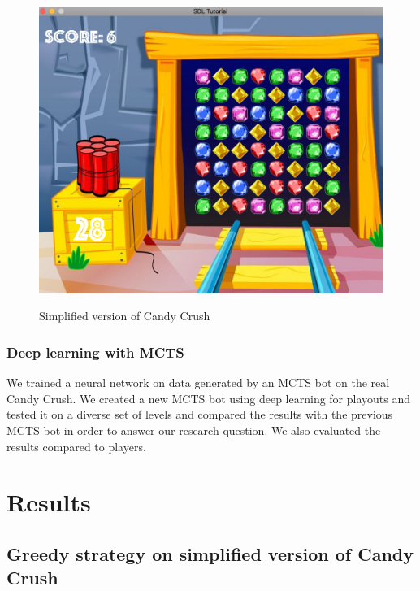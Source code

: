 \documentclass{kththesis}
\begin{document}
\begin{figure}
\centering
\includegraphics[width=\textwidth]{images/candy_small.png}
\label{fig:candy_small}
\caption{Simplified version of Candy Crush}
\end{figure}

\subsection{Deep learning with MCTS}
We trained a neural network on data generated by an MCTS bot on the real Candy Crush. We created a new MCTS bot using deep learning for playouts and tested it on a diverse  set of levels and compared the results with the previous MCTS bot in order to answer our research question. We also evaluated the results compared to players.
\chapter{Results}

\section{Greedy strategy on simplified version of Candy Crush}
\end{document}
